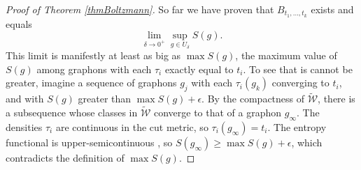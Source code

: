 \documentclass[12pt]{amsart}
\newcommand{\tdens}{\tau}
\newcommand{\1}{\mathbf{1}}
\newcommand{\www}{{\mathcal W}}
\begin{document}
\begin{proof}[Proof of Theorem \ref{thmBoltzmann}]
So far we have proven that $\displaystyle B_{t_1,\ldots,t_k}$ exists and equals
\begin{equation} \lim_{\delta \to 0^+}
\sup_{g \in U_\delta} S(g).\end{equation} 
This limit is manifestly at least as big as $\max S(g)$, the maximum value of $S(g)$ among 
graphons with each $\tdens_i$ exactly equal to $t_i$. To see that is cannot be greater,
imagine a sequence of graphons $g_j$  with each $\tdens_i(g_k)$ converging to $t_i$, 
and with $S(g)$ greater than $\max S(g) + \epsilon$. By the compactness of $\widetilde 
\www$, there is a subsequence whose classes in $\widetilde \www$ converge to that of 
a graphon $g_\infty$. The densities
$\tdens_i$ are continuous in the cut metric, so $\tdens_i(g_\infty)=t_i$. The 
entropy functional 
is upper-semicontinuous \cite{CV}, so $S(g_\infty) \ge \max S(g) + \epsilon$, 
which contradicts the definition of $\max S(g)$. 

\end{proof} 

\medskip
\end{document}
